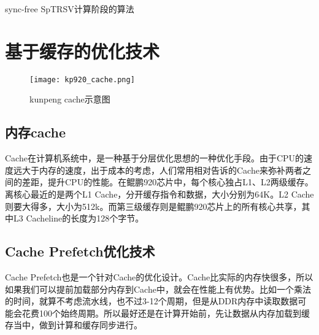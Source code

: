 \begin{algorithm}[htbp]
    \caption{sync-free SpTRSV计算阶段的算法}
    \label{sync-free alogrithm solve}

    
\end{algorithm}

\section{基于缓存的优化技术}

\begin{figure}[htbp]
    \centering
    \texttt{[image: kp920\_cache.png]}
    \caption{kunpeng cache示意图}
    \label{kunpeng cache示意图}
\end{figure}


\subsection{内存cache}

Cache在计算机系统中，是一种基于分层优化思想的一种优化手段。由于CPU的速度远大于内存的速度，出于成本的考虑，人们常用相对告诉的Cache来弥补两者之间的差距，提升CPU的性能。在鲲鹏920芯片中，每个核心独占L1、L2两级缓存。离核心最近的是两个L1 Cache，分开缓存指令和数据，大小分别为64K。L2 Cache则要大得多，大小为512k。而第三级缓存则是鲲鹏920芯片上的所有核心共享，其中L3 Cacheline的长度为128个字节。

\subsection{Cache Prefetch优化技术}
Cache Prefetch也是一个针对Cache的优化设计。Cache比实际的内存快很多，所以如果我们可以提前加载部分内存到Cache中，就会在性能上有优势。比如一个乘法的时间，就算不考虑流水线，也不过3-12个周期，但是从DDR内存中读取数据可能会花费100个始终周期。所以最好还是在计算开始前，先让数据从内存加载到缓存当中，做到计算和缓存同步进行。

